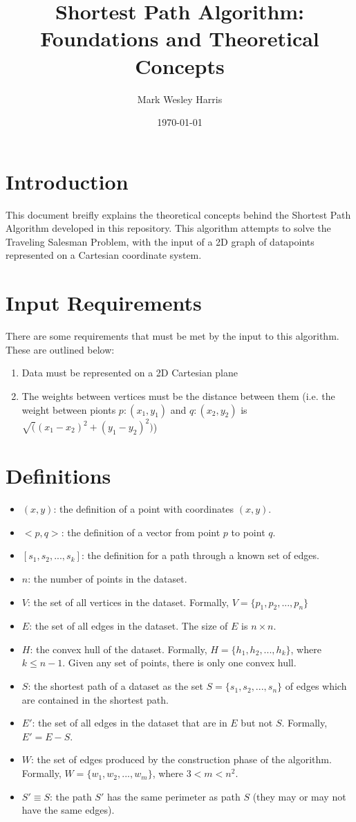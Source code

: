 \documentclass[12pt]{article}
\title{Shortest Path Algorithm:\\
Foundations and Theoretical Concepts}
\author{
Mark Wesley Harris
}
\date{\today}
\begin{document}
\maketitle

\section{Introduction}\label{sec:intro}
This document breifly explains the theoretical concepts behind the
Shortest Path Algorithm developed in this repository. This algorithm attempts
to solve the Traveling Salesman Problem, with the input of a 2D graph of datapoints
represented on a Cartesian coordinate system.

\section{Input Requirements}\label{sec:req}
There are some requirements that must be met by the input to this algorithm.
These are outlined below:
\begin{enumerate}
\item Data must be represented on a 2D Cartesian plane
\item The weights between vertices must be the distance between them
(i.e. the weight between pionts $p:(x_1, y_1)$ and $q:(x_2, y_2)$ is $\sqrt((x_1 - x_2)^2 + (y_1 - y_2)^2)$)
\end{enumerate}

\section{Definitions}\label{sec:def}
\begin{itemize}
\item $(x,y)$: the definition of a point with coordinates $(x,y)$.
\item $<p,q>$: the definition of a vector from point $p$ to point $q$.
\item $[s_1, s_2, ..., s_k]$: the definition for a path through a known set of edges.
\item $n$: the number of points in the dataset.
\item $V$: the set of all vertices in the dataset.
Formally, $V = \{p_1, p_2, ..., p_n\}$
\item $E$: the set of all edges in the dataset.
The size of $E$ is $n \times n$.
\item $H$: the convex hull of the dataset.
Formally, $H = \{h_1, h_2, ..., h_k\}$, where $k \leq n - 1$.
Given any set of points,
there is only one convex hull.
\item $S$: the shortest path of a dataset as the set $S = \{s_1, s_2, ..., s_n\}$
of edges which are contained in the shortest path.
\item $E'$: the set of all edges in the dataset that are in $E$ but not $S$.
Formally, $E' = E - S$.
\item $W$: the set of edges produced by the construction phase of the algorithm.
Formally, $W = \{w_1, w_2, ..., w_m\}$, where $3 < m < n^2$.
\item $S' \equiv S$: the path $S'$ has the same perimeter as path $S$
(they may or may not have the same edges).
\end{itemize}
\end{document}

